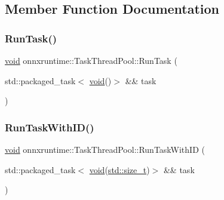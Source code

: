 \subsection{Member Function Documentation}
\mbox{\label{classonnxruntime_1_1TaskThreadPool_adef074fd30b2be99af2f75392ad241ee}} 
\subsubsection{\texorpdfstring{Run\+Task()}{RunTask()}}
{\footnotesize\ttfamily \mbox{\hyperlink{mlasi_8h_a88f941d423cb2a819b70a1358982b1a6}{void}} onnxruntime\+::\+Task\+Thread\+Pool\+::\+Run\+Task (\begin{DoxyParamCaption}\item[{std\+::packaged\+\_\+task$<$ \mbox{\hyperlink{mlasi_8h_a88f941d423cb2a819b70a1358982b1a6}{void}}()$>$ \&\&}]{task }\end{DoxyParamCaption})\hspace{0.3cm}{\ttfamily [inline]}}

\mbox{\label{classonnxruntime_1_1TaskThreadPool_a3a4ac001b97cc07fe7e1ba589c631021}} 
\subsubsection{\texorpdfstring{Run\+Task\+With\+I\+D()}{RunTaskWithID()}}
{\footnotesize\ttfamily \mbox{\hyperlink{mlasi_8h_a88f941d423cb2a819b70a1358982b1a6}{void}} onnxruntime\+::\+Task\+Thread\+Pool\+::\+Run\+Task\+With\+ID (\begin{DoxyParamCaption}\item[{std\+::packaged\+\_\+task$<$ \mbox{\hyperlink{mlasi_8h_a88f941d423cb2a819b70a1358982b1a6}{void}}(\mbox{\hyperlink{mlasi_8h_a503efbc1c6e50825320ad909366b78ab}{std\+::size\+\_\+t}})$>$ \&\&}]{task }\end{DoxyParamCaption})\hspace{0.3cm}{\ttfamily [inline]}}

